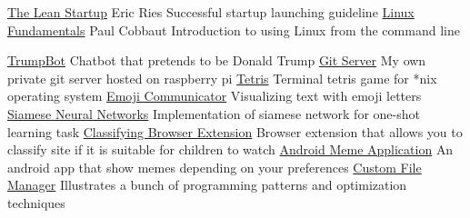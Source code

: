 \documentclass[
	a4paper,
]{fortysecondscv}
\begin{document}
\begin{cvtable}[1.5]
        {\href{https://en.wikipedia.org/wiki/The_Lean_Startup}
        {The Lean Startup}}
        {Eric Ries}
        {Successful startup launching guideline}
        {\href{http://linux-training.be/linuxfun.pdf}
        {Linux Fundamentals}}
        {Paul Cobbaut}
        {Introduction to using Linux from the command line}
\end{cvtable}



\addtobacksidebar{}

\newpage
\begin{sidebar}
    \nameandjob

    \setlength{\parskip}{1ex}

\end{sidebar}

\begin{cvtable}[1.5]
        {\href{https://github.com/SmirnovAlexander/chatbot}
        {TrumpBot}}{}
        {Chatbot that pretends to be Donald Trump}
        {\href{http://git.asmirnov.xyz/}
        {Git Server}}{}
        {My own private git server hosted on raspberry pi}
        {\href{https://github.com/SmirnovAlexander/Tetris}
        {Tetris}}{}
        {Terminal tetris game for *nix operating system}
        {\href{https://github.com/SmirnovAlexander/EmojiCommunicator}
        {Emoji Communicator}}{}
        {Visualizing text with emoji letters}
        {\href{https://github.com/SmirnovAlexander/OneShotLearningSiameseNetworks}
        {Siamese Neural Networks}}{}
        {Implementation of siamese network for one-shot learning task}
        {\href{https://github.com/SmirnovAlexander/WebsiteClassifier}
        {Classifying Browser Extension}}{}
        {Browser extension that allows you to classify site if it is suitable for children to watch}
        {\href{https://github.com/SmirnovAlexander/MemDer}
        {Android Meme Application}}{}
        {An android app that show memes depending on your preferences}
        {\href{https://github.com/SmirnovAlexander/SuperManager}
        {Custom File Manager}}{}
        {Illustrates a bunch of programming patterns and optimization techniques}
\end{cvtable}
\end{document}
